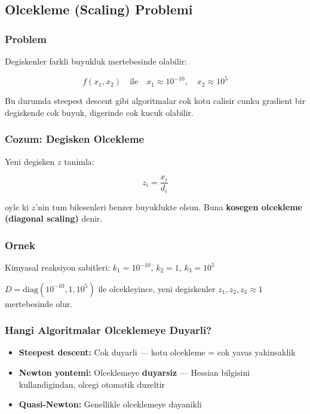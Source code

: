 \documentclass[12pt,a4paper]{article}
\theoremstyle{definition}
\theoremstyle{remark}
\begin{document}
\subsection{Olcekleme (Scaling) Problemi}

\subsubsection{Problem}

Degiskenler farkli buyukluk mertebesinde olabilir:

\[
f(x_1, x_2) \quad \text{ile} \quad x_1 \approx 10^{-10}, \quad x_2 \approx 10^5
\]

Bu durumda steepest descent gibi algoritmalar cok kotu calisir cunku gradient bir degiskende cok buyuk, digerinde cok kucuk olabilir.

\subsubsection{Cozum: Degisken Olcekleme}

Yeni degisken $z$ tanimla:

\[
z_i = \frac{x_i}{d_i}
\]

oyle ki $z$'nin tum bilesenleri benzer buyuklukte olsun. Buna \textbf{kosegen olcekleme (diagonal scaling)} denir.

\subsubsection{Ornek}

Kimyasal reaksiyon sabitleri: $k_1 = 10^{-10}$, $k_2 = 1$, $k_3 = 10^5$

$D = \text{diag}(10^{-10}, 1, 10^5)$ ile olcekleyince, yeni degiskenler $z_1, z_2, z_3 \approx 1$ mertebesinde olur.

\subsubsection{Hangi Algoritmalar Olceklemeye Duyarli?}

\begin{itemize}[leftmargin=*, itemsep=0.2em]
\item \textbf{Steepest descent:} Cok duyarli --- kotu olcekleme = cok yavas yakinsaklik
\item \textbf{Newton yontemi:} Olceklemeye \textbf{duyarsiz} --- Hessian bilgisini kullandigindan, olcegi otomatik duzeltir
\item \textbf{Quasi-Newton:} Genellikle olceklemeye dayanikli
\end{itemize}
\end{document}
